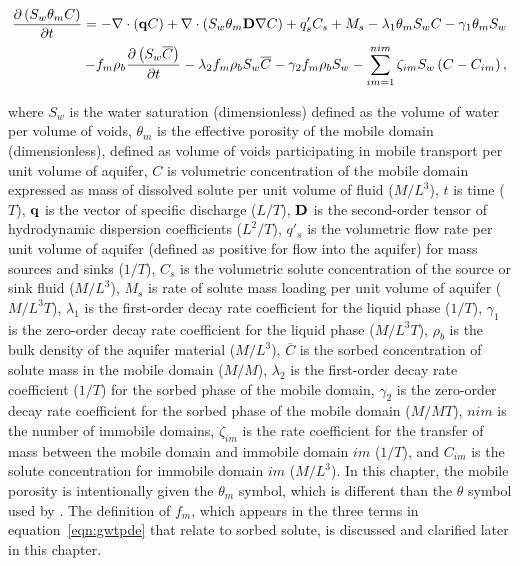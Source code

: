 \begin{equation}
\label{eqn:gwtpde}
\begin{aligned}
\frac {\partial \left ( S_w \theta_m C \right )}{\partial t} = 
- \nabla \cdot \left ( \mathbf{q} C  \right ) 
+ \nabla \cdot \left ( S_w \theta_m \mathbf{D} \nabla C \right ) 
+ q'_s C_s + M_s  
- \lambda_1 \theta_m S_w C - \gamma_1 \theta_m S_w \\
- f_m \rho_b \frac {\partial \left ( S_w \overline{C} \right ) }{\partial t} 
- \lambda_2 f_m \rho_b S_w \overline{C} - \gamma_2 f_m \rho_b S_w 
- \sum \limits_{im=1}^{nim}  \zeta_{im} S_w \left ( C - C_{im} \right ),
\end{aligned}
\end{equation}

\noindent where $S_w$ is the water saturation (dimensionless) defined as the volume of water per volume of voids, $\theta_m$ is the effective porosity of the mobile domain (dimensionless), defined as volume of voids participating in mobile transport per unit volume of aquifer, $C$ is volumetric concentration of the mobile domain expressed as mass of dissolved solute per unit volume of fluid ($M/L^3$), $t$ is time ($T$), $\mathbf{q}$ is the vector of specific discharge ($L/T$), $\mathbf{D}$ is the second-order tensor of hydrodynamic dispersion coefficients ($L^2/T$), $q'_s$ is the volumetric flow rate per unit volume of aquifer (defined as positive for flow into the aquifer) for mass sources and sinks ($1/T$), $C_s$ is the volumetric solute concentration of the source or sink fluid ($M/L^3$), $M_s$ is rate of solute mass loading per unit volume of aquifer ($M/L^3T$), $\lambda_1$ is the first-order decay rate coefficient for the liquid phase ($1/T$), $\gamma_1$ is the zero-order decay rate coefficient for the liquid phase ($M/L^3T$), $\rho_b$ is the bulk density of the aquifer material ($M/L^3$), $\overline{C}$ is the sorbed concentration of solute mass in the mobile domain ($M/M$), $\lambda_2$ is the first-order decay rate coefficient ($1/T$) for the sorbed phase of the mobile domain,  $\gamma_2$ is the zero-order decay rate coefficient for the sorbed phase of the mobile domain ($M/MT$), $nim$ is the number of immobile domains, $\zeta_{im}$ is the rate coefficient for the transfer of mass between the mobile domain and immobile domain $im$ ($1/T$), and $C_{im}$ is the solute concentration for immobile domain $im$ ($M/L^3$). In this chapter, the mobile porosity is intentionally given the $\theta_m$ symbol, which is different than the $\theta$ symbol used by \cite{modflow6gwt}.  The definition of $f_m$, which appears in the three terms in equation~\ref{eqn:gwtpde} that relate to sorbed solute, is discussed and clarified later in this chapter. 

